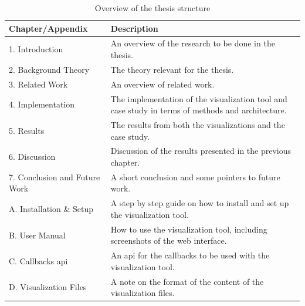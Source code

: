 \begin{table}[!h]
\begin{center}
\begin{tabular}{ | l | p{7.3cm} |}
\hline
\textbf{Chapter/Appendix} & \textbf{Description} \\ \hline
1. Introduction & An overview of the research to be done in the thesis. \\ \hline
2. Background Theory & The theory relevant for the thesis. \\ \hline
3. Related Work & An overview of related work. \\ \hline
4. Implementation & The implementation of the visualization tool and case study in terms of methods and architecture. \\ \hline
5. Results & The results from both the visualizations and the case study. \\ \hline
6. Discussion & Discussion of the results presented in the previous chapter. \\ \hline
7. Conclusion and Future Work & A short conclusion and some pointers to future work. \\ \hline
A. Installation \& Setup & A step by step guide on how to install and set up the visualization tool. \\ \hline
B. User Manual & How to use the visualization tool, including screenshots of the web interface. \\ \hline
C. Callbacks \acrshort{api} & An \acrfull{api} for the callbacks to be used with the visualization tool. \\ \hline
D. Visualization Files & A note on the format of the content of the visualization files. \\ \hline
\end{tabular}
\end{center}
\caption{Overview of the thesis structure}
\label{tab:thesis-structure}
\end{table}

\cleardoublepage